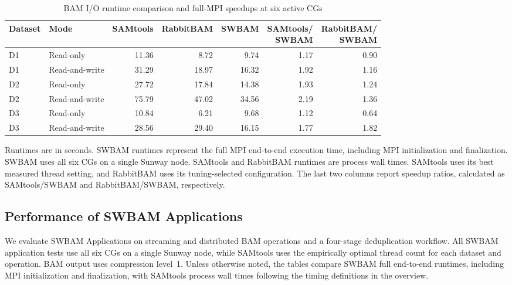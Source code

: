 \documentclass[lettersize,journal]{IEEEtran}
\begin{document}
\begin{table}[!t]
\centering
\begin{threeparttable}
\caption{BAM I/O runtime comparison and full-MPI speedups at six active CGs}
\label{tab:library-io-comparison}
\scriptsize
\setlength{\tabcolsep}{1.5pt}
\begin{tabular*}{\columnwidth}{@{\extracolsep{\fill}}llrrrrr@{}}
\toprule
Dataset & Mode & SAMtools & RabbitBAM &
SWBAM &
\shortstack{SAMtools/\\SWBAM} &
\shortstack{RabbitBAM/\\SWBAM} \\
\midrule
D1 & Read-only      & 11.36 & 8.72  & 9.74  & 1.17 & 0.90 \\
D1 & Read-and-write & 31.29 & 18.97 & 16.32 & 1.92 & 1.16 \\
\midrule
D2 & Read-only      & 27.72 & 17.84 & 14.38 & 1.93 & 1.24 \\
D2 & Read-and-write & 75.79 & 47.02 & 34.56 & 2.19 & 1.36 \\
\midrule
D3 & Read-only      & 10.84 & 6.21  & 9.68  & 1.12 & 0.64 \\
D3 & Read-and-write & 28.56 & 29.40 & 16.15 & 1.77 & 1.82 \\
\bottomrule
\end{tabular*}
\begin{tablenotes}[flushleft]
\scriptsize
\item Runtimes are in seconds.
SWBAM runtimes represent the full MPI end-to-end execution time, including MPI initialization and finalization.
SWBAM uses all six CGs on a single Sunway node.
SAMtools and RabbitBAM runtimes are process wall times.
SAMtools uses its best measured thread setting, and RabbitBAM uses its tuning-selected configuration.
The last two columns report speedup ratios, calculated as SAMtools/SWBAM and RabbitBAM/SWBAM, respectively.
\end{tablenotes}
\end{threeparttable}
\end{table}

\subsection{Performance of SWBAM Applications}
We evaluate SWBAM Applications on streaming and distributed BAM operations and a four-stage deduplication workflow.
All SWBAM application tests use all six CGs on a single Sunway node, while SAMtools uses the empirically optimal thread count for each dataset and operation.
BAM output uses compression level~1.
Unless otherwise noted, the tables compare SWBAM full end-to-end runtimes, including MPI initialization and finalization, with SAMtools process wall times following the timing definitions in the overview.
\end{document}
